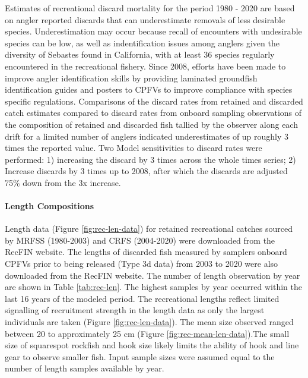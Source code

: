 \documentclass[11pt,
  english,
  a4paper,
]{article}
\begin{document}

Estimates of recreational discard mortality for the period 1980 - 2020 are based on angler reported discards that can underestimate removals of less desirable species. Underestimation may occur because recall of encounters with undesirable species can be low, as well as indentification issues among anglers given the diversity of Sebastes found in California, with at least 36 species regularly encountered in the recreational fishery. Since 2008, efforts have been made to improve angler identification skills by providing laminated groundfish identification guides and posters to CPFVs to improve compliance with species specific regulations. Comparisons of the discard rates from retained and discarded catch estimates compared to discard rates from onboard sampling observations of the composition of retained and discarded fish tallied by the observer along each drift for a limited number of anglers indicated underestimates of up roughly 3 times the reported value. Two Model sensitivities to discard rates were performed: 1) increasing the discard by 3 times across the whole times series; 2) Increase discards by 3 times up to 2008, after which the discards are adjusted 75\% down from the 3x increase.

\leavevmode\tagmcend\tagstructend\par


\hypertarget{length-compositions}{%
\paragraph{Length Compositions}\label{length-compositions}}

\leavevmode\tagmcend\tagstructend


Length data (Figure \ref{fig:rec-len-data}) for retained recreational catches sourced by MRFSS (1980-2003) and CRFS (2004-2020) were downloaded from the RecFIN website. The lengths of discarded fish measured by samplers onboard CPFVs prior to being released (Type 3d data) from 2003 to 2020 were also downloaded from the RecFIN website. The number of length observation by year are shown in Table \ref{tab:rec-len}. The highest samples by year occurred within the last 16 years of the modeled period. The recreational lengths reflect limited signalling of recruitment strength in the length data as only the largest individuals are taken (Figure \ref{fig:rec-len-data}). The mean size observed ranged between 20 to approximately 25 cm (Figure \ref{fig:rec-mean-len-data}).The small size of squarespot rockfish and hook size likely limits the ability of hook and line gear to observe smaller fish. Input sample sizes were assumed equal to the number of length samples available by year.
\end{document}
